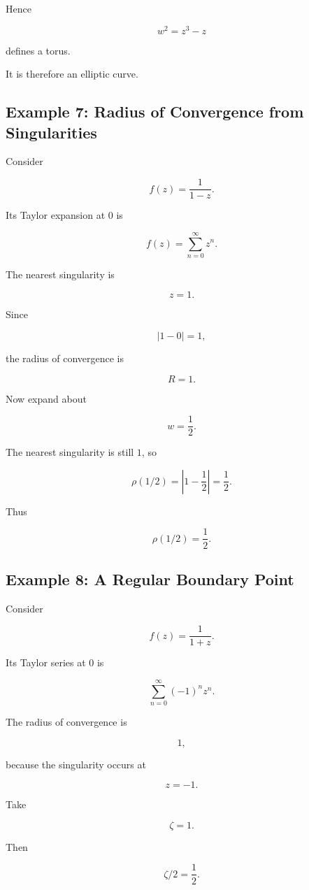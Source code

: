 \documentclass[12pt,a4paper]{article}
\theoremstyle{notespace}
\begin{document}
Hence

\[
\boxed{
	w^2=z^3-z
}
\]

defines a torus.

It is therefore an elliptic curve.

\bigskip

\subsection{Example 7: Radius of Convergence from Singularities}

Consider

\[
f(z)
=
\frac1{1-z}.
\]

Its Taylor expansion at \(0\) is

\[
f(z)
=
\sum_{n=0}^{\infty}z^n.
\]

The nearest singularity is

\[
z=1.
\]

Since

\[
|1-0|=1,
\]

the radius of convergence is

\[
R=1.
\]

Now expand about

\[
w=\frac12.
\]

The nearest singularity is still \(1\), so

\[
\rho(1/2)
=
\left|1-\frac12\right|
=
\frac12.
\]

Thus

\[
\boxed{
	\rho(1/2)=\frac12.
}
\]

\bigskip

\subsection{Example 8: A Regular Boundary Point}

Consider

\[
f(z)
=
\frac1{1+z}.
\]

Its Taylor series at \(0\) is

\[
\sum_{n=0}^{\infty}
(-1)^n z^n.
\]

The radius of convergence is

\[
1,
\]

because the singularity occurs at

\[
z=-1.
\]

Take

\[
\zeta=1.
\]

Then

\[
\zeta/2=\frac12.
\]
\end{document}
